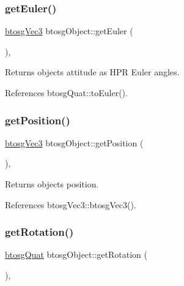 \subsubsection{\texorpdfstring{get\+Euler()}{getEuler()}}
{\footnotesize\ttfamily \hyperlink{classbtosgVec3}{btosg\+Vec3} btosg\+Object\+::get\+Euler (\begin{DoxyParamCaption}{ }\end{DoxyParamCaption})\hspace{0.3cm}{\ttfamily [inline]}, {\ttfamily [inherited]}}

Returns object\textquotesingle{}s attitude as H\+PR Euler angles. 

References btosg\+Quat\+::to\+Euler().

\mbox{\label{classbtosgObject_a3dadd5da8f2a312e44a039446b93d4cd}} 
\subsubsection{\texorpdfstring{get\+Position()}{getPosition()}}
{\footnotesize\ttfamily \hyperlink{classbtosgVec3}{btosg\+Vec3} btosg\+Object\+::get\+Position (\begin{DoxyParamCaption}{ }\end{DoxyParamCaption})\hspace{0.3cm}{\ttfamily [inline]}, {\ttfamily [inherited]}}

Returns object\textquotesingle{}s position. 

References btosg\+Vec3\+::btosg\+Vec3().

\mbox{\label{classbtosgObject_a3b825999ad3a51bde743d4085ff19dae}} 
\subsubsection{\texorpdfstring{get\+Rotation()}{getRotation()}}
{\footnotesize\ttfamily \hyperlink{classbtosgQuat}{btosg\+Quat} btosg\+Object\+::get\+Rotation (\begin{DoxyParamCaption}{ }\end{DoxyParamCaption})\hspace{0.3cm}{\ttfamily [inline]}, {\ttfamily [inherited]}}


